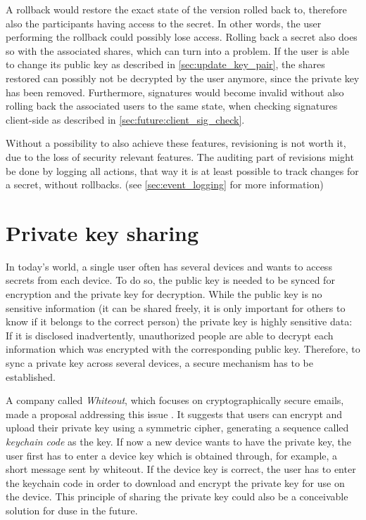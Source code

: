 A rollback would restore the exact state of the version rolled back to,
therefore also the participants having access to the secret. In other words,
the user performing the rollback could possibly lose access. Rolling back a
secret also does so with the associated shares, which can turn into a problem.
If the user is able to change its public key as described in
\ref{sec:update_key_pair}, the shares restored can possibly not be decrypted by
the user anymore, since the private key has been removed. Furthermore,
signatures would become invalid without also rolling back the associated users
to the same state, when checking signatures client-side as described in
\ref{sec:future:client_sig_check}.

Without a possibility to also achieve these features, revisioning is not worth
it, due to the loss of security relevant features. The auditing part of
revisions might be done by logging all actions, that way it is at least
possible to track changes for a secret, without rollbacks. (see
\ref{sec:event_logging} for more information)

\section{Private key sharing}

In today's world, a single user often has several devices and wants to access
secrets from each device. To do so, the public key is needed to be synced for
encryption and the private key for decryption. While the public key is no
sensitive information (it can be shared freely, it is only important for others
to know if it belongs to the correct person) the private key is highly sensitive
data: If it is disclosed inadvertently, unauthorized people are able to decrypt
each information which was encrypted with the corresponding public key. Therefore,
to sync a private key across several devices, a secure mechanism has to be
established.

A company called \textit{Whiteout}, which focuses on cryptographically secure
emails, made a proposal addressing this issue \cite{whiteout_pgp_sync}. It
suggests that users can encrypt and upload their private key using a symmetric
cipher, generating a sequence called \textit{keychain code} as the key.
If now a new device wants to have the private key, the user first has to enter
a device key which is obtained through, for example, a short message sent by
whiteout. If the device key is correct, the user has to enter the keychain code
in order to download and encrypt the private key for use on the device.
This principle of sharing the private key could also be a conceivable solution
for duse in the future. \cite{whiteout_pgp_sync}

